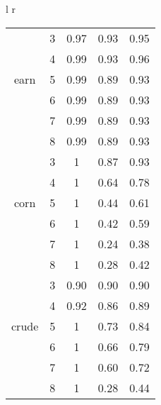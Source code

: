 \begin{tabular}{l r}
\begin{tabular}{| c | c | c | c | c | }
	
	
	& 3 & 0.97 & 0.93 &  0.95    \\ 
	& 4 & 0.99 & 0.93 &  0.96    \\ 
	earn & 5 & 0.99 & 0.89 &  0.93    \\ 
	& 6 & 0.99 & 0.89 &  0.93    \\ 
	& 7 & 0.99 & 0.89 &  0.93    \\ 
	& 8 & 0.99 & 0.89 &  0.93    \\ \hline
	
	
	
	& 3 & 1 & 0.87 & 0.93     \\ 
	& 4 & 1 & 0.64 & 0.78     \\ 
	corn	& 5 & 1 & 0.44 &  0.61    \\ 
	& 6 & 1 & 0.42 & 0.59     \\ 
	& 7 & 1 & 0.24 & 0.38    \\ 
	& 8 & 1 & 0.28& 0.42     \\ \hline
	
	
	& 3 & 0.90 & 0.90 &  0.90    \\ 
	& 4 & 0.92 & 0.86 & 0.89     \\ 
	crude & 5 & 1 & 0.73 &  0.84    \\ 
	& 6 & 1 & 0.66 &  0.79    \\
	& 7 & 1 & 0.60 &  0.72    \\
	& 8 & 1 & 0.28 &  0.44    \\ \hline 
	
	
	
\end{tabular} \\

\end{tabular} %




